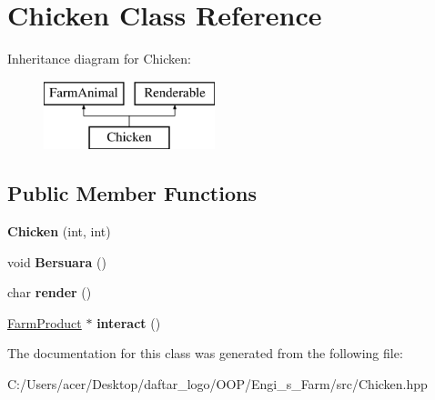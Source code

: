 \hypertarget{class_chicken}{}\section{Chicken Class Reference}
\label{class_chicken}
Inheritance diagram for Chicken\+:\begin{figure}[H]
\begin{center}
\leavevmode
\includegraphics[height=2.000000cm]{class_chicken}
\end{center}
\end{figure}
\subsection*{Public Member Functions}
\begin{DoxyCompactItemize}
\item 
\mbox{\label{class_chicken_ac4459e456baa4dc168f3162d48108c31}} 
{\bfseries Chicken} (int, int)
\item 
\mbox{\label{class_chicken_a48dfbe2a097d1f4b6b27d1ba6a9e1b77}} 
void {\bfseries Bersuara} ()
\item 
\mbox{\label{class_chicken_a0f3537589ee4822186aad3c8cf105db3}} 
char {\bfseries render} ()
\item 
\mbox{\label{class_chicken_a7f12847b088fb284930523af209b996b}} 
\mbox{\hyperlink{class_farm_product}{Farm\+Product}} $\ast$ {\bfseries interact} ()
\end{DoxyCompactItemize}


The documentation for this class was generated from the following file\+:\begin{DoxyCompactItemize}
\item 
C\+:/\+Users/acer/\+Desktop/daftar\+\_\+logo/\+O\+O\+P/\+Engi\+\_\+s\+\_\+\+Farm/src/Chicken.\+hpp\end{DoxyCompactItemize}
